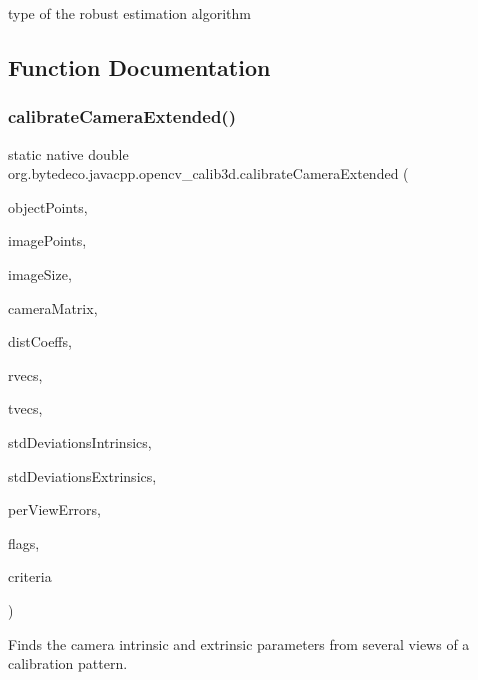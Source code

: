 type of the robust estimation algorithm 

\subsection{Function Documentation}
\mbox{\label{group__calib3d_ga9829f846450d1022f08716b7c20412d6}} 
\subsubsection{\texorpdfstring{calibrate\+Camera\+Extended()}{calibrateCameraExtended()}}
{\footnotesize\ttfamily static native double org.\+bytedeco.\+javacpp.\+opencv\+\_\+calib3d.\+calibrate\+Camera\+Extended (\begin{DoxyParamCaption}\item[{@By\+Val Mat\+Vector}]{object\+Points,  }\item[{@By\+Val Mat\+Vector}]{image\+Points,  }\item[{@By\+Val Size}]{image\+Size,  }\item[{@By\+Val Mat}]{camera\+Matrix,  }\item[{@By\+Val Mat}]{dist\+Coeffs,  }\item[{@By\+Val Mat\+Vector}]{rvecs,  }\item[{@By\+Val Mat\+Vector}]{tvecs,  }\item[{@By\+Val Mat}]{std\+Deviations\+Intrinsics,  }\item[{@By\+Val Mat}]{std\+Deviations\+Extrinsics,  }\item[{@By\+Val Mat}]{per\+View\+Errors,  }\item[{int}]{flags,  }\item[{@By\+Val(null\+Value=\char`\"{}cv\+::\+Term\+Criteria(\char`\"{}+\char`\"{}cv\+::\+Term\+Criteria\+::\+C\+O\+U\+NT + cv\+::\+Term\+Criteria\+::\+E\+PS, 30, D\+B\+L\+\_\+\+E\+P\+S\+I\+L\+ON)\char`\"{}) Term\+Criteria}]{criteria }\end{DoxyParamCaption})\hspace{0.3cm}{\ttfamily [static]}}



Finds the camera intrinsic and extrinsic parameters from several views of a calibration pattern. 



